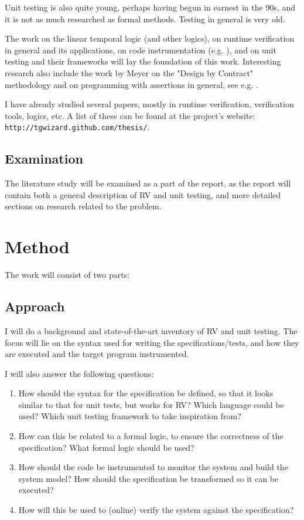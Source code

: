 \documentclass[a4paper,11pt]{article}
\begin{document}
Unit testing is also quite young, perhaps having begun in earnest in the 90s, and it is not as much researched as formal methods. Testing in general is very old.

The work on the linear temporal logic (and other logics), on runtime verification in general and its applications, on code instrumentation (e.g. \cite{aspectj,matusiak09}), and on unit testing and their frameworks will lay the foundation of this work. Interesting research also include the work by Meyer on the "Design by Contract" methodology \cite{meyer92} and on programming with assertions in general, see e.g. \cite{rosenblum95,bartetzko01}.

I have already studied several papers, mostly in runtime verification, verification tools, logics, etc.
A list of these can be found at the project's website: \texttt{http://tgwizard.github.com/thesis/}.

\subsection{Examination}

The literature study will be examined as a part of the report, as the report will contain
both a general description of RV and unit testing, and more detailed sections on research related to the problem.


\section{Method}

The work will consist of two parts:


\subsection{Approach}

I will do a background and state-of-the-art inventory of RV and unit testing. The focus will lie on the syntax used for writing the specifications/tests, and how they are executed and the target program instrumented.

I will also answer the following questions:

\begin{enumerate}
	\item How should the syntax for the specification be defined,
		so that it looks similar to that for unit tests, but works for RV?
		Which language could be used? Which unit testing framework to take inspiration from?
	\item How can this be related to a formal logic, to ensure the correctness of the specification?
		What formal logic should be used? 
	\item How should the code be instrumented to monitor the system and build the system model?
		How should the specification be transformed so it can be executed? 
	\item How will this be used to (online) verify the system against the specification?
\end{enumerate}
\end{document}
